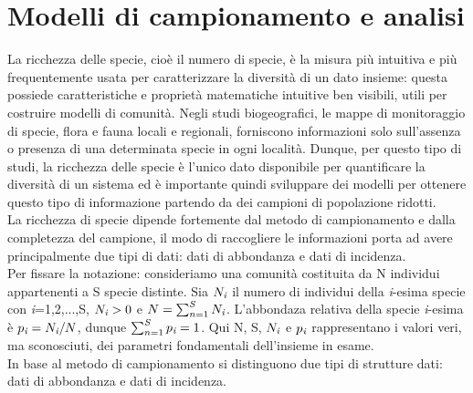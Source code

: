\chapter{Modelli di campionamento e analisi}









La ricchezza delle specie, cioè il numero di specie, è la misura più intuitiva e più frequentemente usata per caratterizzare la diversità di un dato insieme: questa possiede caratteristiche e proprietà matematiche intuitive ben visibili, utili per costruire modelli di comunità. Negli studi biogeografici, le mappe di monitoraggio di specie, flora e fauna locali e regionali, forniscono informazioni solo sull'assenza o presenza di una determinata specie in ogni località. Dunque, per questo tipo di studi, la ricchezza delle specie è l'unico dato disponibile per quantificare la diversità di un sistema ed è importante quindi sviluppare dei modelli per ottenere questo tipo di informazione partendo da dei campioni di popolazione ridotti.\\
La ricchezza di specie dipende fortemente dal metodo di campionamento e dalla completezza del campione, il modo di raccogliere le informazioni porta ad avere principalmente due tipi di dati: dati di abbondanza e dati di incidenza.\\
Per fissare la notazione: consideriamo una comunità costituita da N individui appartenenti a S specie distinte. Sia $N_\emph{i}$ il numero di individui della \emph{i}-esima specie con \emph{i}=1,2,...,S, $N_\emph{i}>0$ e $N=\sum_{n=1}^S N_\emph{i}$.
L'abbondaza relativa della specie \emph{i}-esima è $p_\emph{i}=N_\emph{i}/N$, dunque $\sum_{n=1}^S p_\emph{i}=1$. Qui N, S, $N_\emph{i}$ e $p_\emph{i}$ rappresentano i valori veri, ma sconosciuti, dei parametri fondamentali dell'insieme in esame.\\
In base al metodo di campionamento si distinguono due tipi di strutture dati: dati di abbondanza e dati di incidenza\cite{doi:ChaoChiu2016}.

